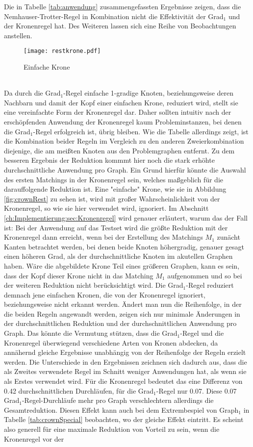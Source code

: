 Die in Tabelle \ref{tab:anwendung} zusammengefassten Ergebnisse zeigen, dass die Nemhauser-Trotter-Regel in Kombination nicht die Effektivität der Grad$_{1}$ und der Kronenregel hat. Des Weiteren lassen sich eine Reihe von Beobachtungen anstellen.
\begin{figure}[htb]
\centering
  	{\texttt{[image: restkrone.pdf]}}
	\caption{Einfache Krone\label{fig:restcrown}}
\centering
\end{figure}
\\
Da durch die Grad$_{1}$-Regel einfache 1-gradige Knoten, beziehungsweise deren Nachbarn und damit der Kopf einer einfachen Krone, reduziert wird, stellt sie eine vereinfachte Form der Kronenregel dar. Daher sollten intuitiv nach der erschöpfenden Anwendung der Kronenregel kaum Probleminstanzen, bei denen die Grad$_{1}$-Regel erfolgreich ist, übrig bleiben. Wie die Tabelle allerdings zeigt, ist die Kombination beider Regeln im Vergleich zu den anderen Zweierkombination diejenige, die am meißten Knoten aus den Problemgraphen entfernt. Zu dem besseren Ergebnis der Reduktion kommmt hier noch die stark erhöhte durchschnittliche Anwendung pro Graph. Ein Grund hierfür könnte die Auswahl des ersten Matchings in der Kronenregel sein, welches maßgeblich für die darauffolgende Reduktion ist. Eine "einfache" Krone, wie sie in Abbildung \ref{fig:crownRest} zu sehen ist, wird mit großer Wahrscheinlichkeit von der Kronenregel, so wie sie hier verwendet wird, ignoriert. Im Abschnitt \ref{ch:Implementierung:sec:Kronenregel} wird genauer erläutert, warum das der Fall ist: Bei der Anwendung auf das Testset wird die größte Reduktion mit der Kronenregel dann erreicht, wenn bei der Erstellung des Matchings $M_{1}$ zunächt Kanten betrachtet werden, bei denen beide Knoten höhergradig, genauer gesagt einen höheren Grad, als der durchschnittliche Knoten im akutellen Graphen haben. Wäre die abgebildete Krone Teil eines größeren Graphen, kann es sein, dass der Kopf dieser Krone nicht in das Matching $M_{1}$ aufgenommen und so bei der weiteren Reduktion nicht berücksichtigt wird. Die Grad$_{1}$-Regel reduziert demnach jene einfachen Kronen, die von der Kronenregel ignoriert, beziehungsweise nicht erkannt werden. Ändert man nun die Reihenfolge, in der die beiden Regeln angewandt werden, zeigen sich nur minimale Änderungen in der durchschnittlichen Reduktion und der durchschnittlichen Anwendung pro Graph. Das könnte die Vermutung stützen, dass die Grad$_{1}$-Regel und die Kronenregel überwiegend verschiedene Arten von Kronen abdecken, da annähernd gleiche Ergebnisse unabhängig von der Reihenfolge der Regeln erzielt werden. Die Unterschiede in den Ergebnissen zeichnen sich dadurch aus, dass die als Zweites verwendete Regel im Schnitt weniger Anwendungen hat, als wenn sie als Erstes verwendet wird. Für die Kronenregel bedeutet das eine Differenz von 0.42 durchschnittlichen Durchläufen, für die Grad$_{1}$-Regel nur 0.07. Diese 0.07 Grad$_{1}$-Regel-Durchläufe mehr pro Graph verschlechtern allerdings die Gesamtreduktion. Diesen Effekt kann auch bei dem Extrembespiel von Graph${_1}$ in Tabelle \ref{tab:crownSpecial} beobachten, wo der gleiche Effekt eintritt. Es scheint also generell für eine maximale Reduktion von Vorteil zu sein, wenn die Kronenregel vor der 